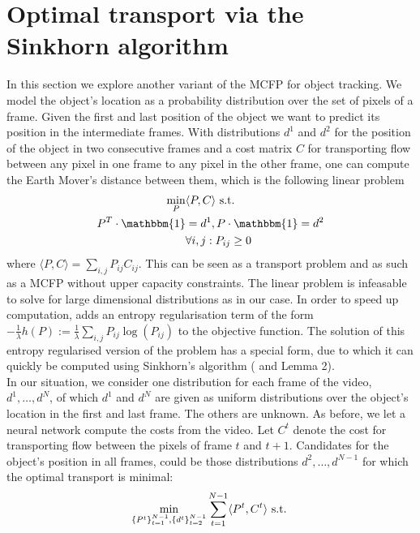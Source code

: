 \documentclass{article}
\begin{document}
{\section{Optimal transport via the Sinkhorn algorithm}\label{Sinkhorn}
In this section we explore another variant of the MCFP for object tracking. We model the object's location as a probability distribution over the set of pixels of a frame. Given the first and last position of the object we want to predict its position in the intermediate frames. With distributions $d^1$ and $d^2$ for the position of the object in two consecutive frames and a cost matrix $C$ for transporting flow between any pixel in one frame to any pixel in the other frame, one can compute the Earth Mover's distance between them, which is the following linear problem
\begin{align}\label{EMD}
\min_{P} &\langle P, C \rangle \textnormal{ s.t. } \\
 P^T \cdot \mathbbm{1} &= d^1,  P\cdot \mathbbm{1} = d^2 \nonumber\\
&\forall i, j: P_{ij} \geq 0 \nonumber
\end{align}
where $\langle P, C \rangle = \sum_{i,j} P_{ij}C_{ij}$. This can be seen as a transport problem and as such as a MCFP without upper capacity constraints. The linear problem is infeasable to solve for large dimensional distributions as in our case. In order to speed up computation, \cite{Cut13} adds an entropy regularisation term of the form \break $-\frac{1}{\lambda}h(P) := \frac{1}{\lambda}\sum_{i,j} P_{ij}\log(P_{ij})$ to the objective function. The solution of this entropy regularised version of the problem has a special form, due to which it can quickly be computed using Sinkhorn's algorithm (\cite{Sink67} and \cite{Cut13} Lemma 2). \\
In our situation, we consider one distribution for each frame of the video, $d^1, \dots, d^N$, of which $d^1$ and $d^N$ are given as uniform distributions over the object's location in the first and last frame. The others are unknown. As before, we let a neural network compute the costs from the video. Let $C^t$ denote the cost for transporting flow between the pixels of frame $t$ and $t+1$. Candidates for the object's position in all frames, could be those distributions $d^2, \dots, d^{N-1}$ for which the optimal transport is minimal:
\begin{align}\label{EMDtrack}
&\min_{\{P^t\}_{t=1}^{N-1}, \{d^t\}_{t=2}^{N-1}} \sum_{t=1}^{N-1} \langle P^t, C^t\rangle \textnormal{ s.t. }\\

\end{align}}
\end{document}
